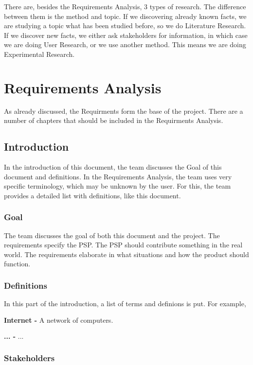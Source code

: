 \documentclass[10pt]{report}
\begin{document}
There are, besides the Requirements Analysis, 3 types of research. The difference between them is the method and topic. If we discovering already known facts, we are studying a topic what has been studied before, so we do Literature Research. If we discover new facts, we either ask stakeholders for information, in which case we are doing User Research, or we use another method. This means we are doing Experimental Research.

\medskip
\minitoc

\newpage

\section{Requirements Analysis}

As already discussed, the Requirments form the base of the project. There are a number of chapters that should be included in the Requirments Analysis.

\subsection{Introduction}

In the introduction of this document, the team discusses the Goal of this document and definitions. In the Requirements Analysis, the team uses very specific terminology, which may be unknown by the user. For this, the team provides a detailed list with definitions, like this document.

\subsubsection{Goal}

The team discusses the goal of both this document and the project. The requirements specify the PSP. The PSP should contribute something in the real world. The requirements elaborate in what situations and how the product should function.

\subsubsection{Definitions}

In this part of the introduction, a list of terms and definions is put. For example,

\textbf{Internet - } A network of computers.

\textbf{... - } ...

\subsubsection{Stakeholders}
\end{document}
